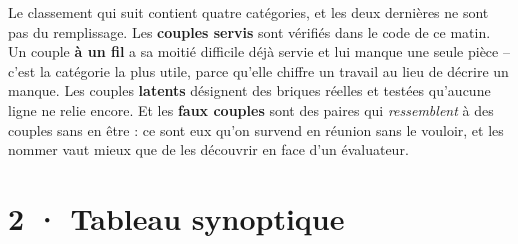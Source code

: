 \documentclass[10pt]{article}
\begin{document}
Le classement qui suit contient quatre catégories, et les deux dernières ne sont pas du remplissage.
Les \textbf{couples servis} sont vérifiés dans le code de ce matin. Un couple \textbf{à un fil} a sa
moitié difficile déjà servie et lui manque une seule pièce -- c'est la catégorie la plus utile, parce
qu'elle chiffre un travail au lieu de décrire un manque. Les couples \textbf{latents} désignent des
briques réelles et testées qu'aucune ligne ne relie encore. Et les \textbf{faux couples} sont des
paires qui \emph{ressemblent} à des couples sans en être : ce sont eux qu'on survend en réunion sans le
vouloir, et les nommer vaut mieux que de les découvrir en face d'un évaluateur.

\section{2 · Tableau synoptique}
\end{document}
